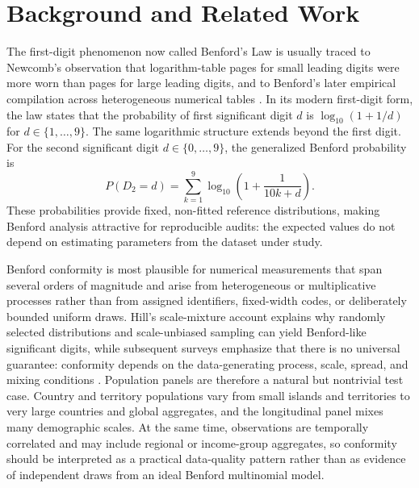 \documentclass[sigconf,nonacm]{acmart}
\begin{document}
\section{Background and Related Work}
\label{sec:background}
The first-digit phenomenon now called Benford's Law is usually traced to Newcomb's observation that logarithm-table pages for small leading digits were more worn than pages for large leading digits, and to Benford's later empirical compilation across heterogeneous numerical tables \cite{newcomb1881,benford1938}. In its modern first-digit form, the law states that the probability of first significant digit \(d\) is \(\log_{10}(1+1/d)\) for \(d\in\{1,\ldots,9\}\). The same logarithmic structure extends beyond the first digit. For the second significant digit \(d\in\{0,\ldots,9\}\), the generalized Benford probability is
\begin{equation}
    P(D_2=d)=\sum_{k=1}^{9}\log_{10}\left(1+\frac{1}{10k+d}\right).
    \label{eq:benford2}
\end{equation}
These probabilities provide fixed, non-fitted reference distributions, making Benford analysis attractive for reproducible audits: the expected values do not depend on estimating parameters from the dataset under study.

Benford conformity is most plausible for numerical measurements that span several orders of magnitude and arise from heterogeneous or multiplicative processes rather than from assigned identifiers, fixed-width codes, or deliberately bounded uniform draws. Hill's scale-mixture account explains why randomly selected distributions and scale-unbiased sampling can yield Benford-like significant digits, while subsequent surveys emphasize that there is no universal guarantee: conformity depends on the data-generating process, scale, spread, and mixing conditions \cite{hill1995,bergerhill2011}. Population panels are therefore a natural but nontrivial test case. Country and territory populations vary from small islands and territories to very large countries and global aggregates, and the longitudinal panel mixes many demographic scales. At the same time, observations are temporally correlated and may include regional or income-group aggregates, so conformity should be interpreted as a practical data-quality pattern rather than as evidence of independent draws from an ideal Benford multinomial model.
\end{document}
